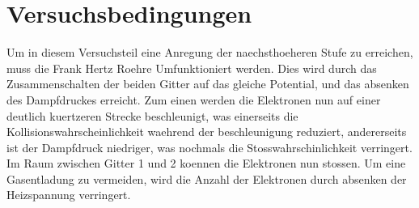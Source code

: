 \section{Versuchsbedingungen}
Um in diesem Versuchsteil eine Anregung der naechsthoeheren Stufe zu erreichen, muss die Frank Hertz Roehre Umfunktioniert werden.
Dies wird durch das Zusammenschalten der beiden Gitter auf das gleiche Potential, und das absenken des Dampfdruckes erreicht.
Zum einen werden die Elektronen nun auf einer deutlich kuertzeren Strecke beschleunigt, was einerseits die Kollisionswahrscheinlichkeit waehrend der beschleunigung reduziert, andererseits ist der Dampfdruck niedriger, was nochmals die Stosswahrschinlichkeit verringert.
Im Raum zwischen Gitter 1 und 2 koennen die Elektronen nun stossen.
Um eine Gasentladung zu vermeiden, wird die Anzahl der Elektronen durch absenken der Heizspannung verringert.\\
